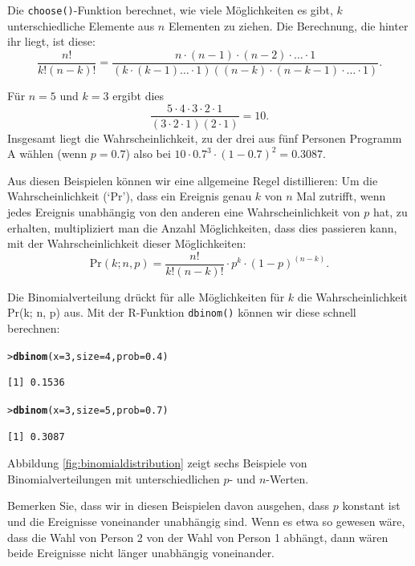 \documentclass[oneside, 10pt]{book}\usepackage[]{graphicx}\usepackage[]{xcolor}
\makeatletter
\newcommand{\hlnum}[1]{\textcolor[rgb]{0.686,0.059,0.569}{#1}}%
\newcommand{\hlstd}[1]{\textcolor[rgb]{0.345,0.345,0.345}{#1}}%
\newcommand{\hlkwc}[1]{\textcolor[rgb]{0.333,0.667,0.333}{#1}}%
\newcommand{\hlkwd}[1]{\textcolor[rgb]{0.737,0.353,0.396}{\textbf{#1}}}%
\newenvironment{kframe}{%
 \def\at@end@of@kframe{}%
 \ifinner\ifhmode%
  \def\at@end@of@kframe{\end{minipage}}%
  \begin{minipage}{\columnwidth}%
 \fi\fi%
 \def\FrameCommand##1{\hskip\@totalleftmargin \hskip-\fboxsep
 \colorbox{shadecolor}{##1}\hskip-\fboxsep
     \hskip-\linewidth \hskip-\@totalleftmargin \hskip\columnwidth}%
 \MakeFramed {\advance\hsize-\width
   \@totalleftmargin\z@ \linewidth\hsize
   \@setminipage}}%
 {\par\unskip\endMakeFramed%
 \at@end@of@kframe}
\newenvironment{knitrout}{}{} %
\makeatother
\begin{document}
\begin{framed}
Die \texttt{choose()}-Funktion berechnet, wie viele Möglichkeiten
es gibt, $k$ unterschiedliche Elemente aus $n$ Elementen zu ziehen.
Die Berechnung, die hinter ihr liegt, ist diese:
\begin{equation*}
\frac{n!}{k!(n-k)!} = \frac{n \cdot (n-1) \cdot (n-2) \cdot \dots \cdot 1}{(k \cdot (k-1) \dots \cdot 1)((n-k) \cdot (n-k-1) \cdot \dots \cdot 1)}.
\end{equation*}

Für $n = 5$ und $k = 3$ ergibt dies
\[
\frac{5 \cdot 4 \cdot 3 \cdot 2 \cdot 1}{(3 \cdot 2 \cdot 1) (2 \cdot 1)} = 10.
\]
Insgesamt liegt die Wahrscheinlichkeit, zu der
drei aus fünf Personen Programm A wählen (wenn $p = 0.7$)
also bei $10 \cdot 0.7^3 \cdot (1-0.7)^2 = 0.3087$.

Aus diesen Beispielen können wir eine allgemeine Regel distillieren:
Um die Wahrscheinlichkeit (`$\textrm{Pr}$'),
dass ein Ereignis genau $k$ von $n$ Mal zutrifft,
wenn jedes Ereignis unabhängig von den anderen eine Wahrscheinlichkeit von $p$ hat, zu erhalten,
multipliziert man die Anzahl Möglichkeiten, dass dies passieren kann,
mit der Wahrscheinlichkeit dieser Möglichkeiten:
\begin{equation*}
 \textrm{Pr}(k; n, p) = \frac{n!}{k!(n-k)!} \cdot p^k \cdot (1-p)^{(n-k)}.
\end{equation*}

Die Binomialverteilung drückt für alle Möglichkeiten für $k$
die Wahrscheinlichkeit \textrm{Pr}(k; n, p) aus. Mit der
R-Funktion \texttt{dbinom()} können wir diese schnell berechnen:
\begin{knitrout}
\color{fgcolor}\begin{kframe}
\begin{alltt}
\hlstd{> }\hlkwd{dbinom}\hlstd{(}\hlkwc{x} \hlstd{=} \hlnum{3}\hlstd{,} \hlkwc{size} \hlstd{=} \hlnum{4}\hlstd{,} \hlkwc{prob} \hlstd{=} \hlnum{0.4}\hlstd{)}
\end{alltt}
\begin{verbatim}
[1] 0.1536
\end{verbatim}
\begin{alltt}
\hlstd{> }\hlkwd{dbinom}\hlstd{(}\hlkwc{x} \hlstd{=} \hlnum{3}\hlstd{,} \hlkwc{size} \hlstd{=} \hlnum{5}\hlstd{,} \hlkwc{prob} \hlstd{=} \hlnum{0.7}\hlstd{)}
\end{alltt}
\begin{verbatim}
[1] 0.3087
\end{verbatim}
\end{kframe}
\end{knitrout}

Abbildung \vref{fig:binomialdistribution} zeigt sechs
Beispiele von Binomialverteilungen mit unterschiedlichen $p$-
und $n$-Werten.

Bemerken Sie, dass wir in diesen Beispielen davon ausgehen,
dass $p$ konstant ist und die Ereignisse voneinander unabhängig sind.
Wenn es etwa so gewesen wäre, dass die Wahl von Person 2 von der
Wahl von Person 1 abhängt, dann wären beide Ereignisse nicht länger
unabhängig voneinander.

\end{framed}
\end{document}
